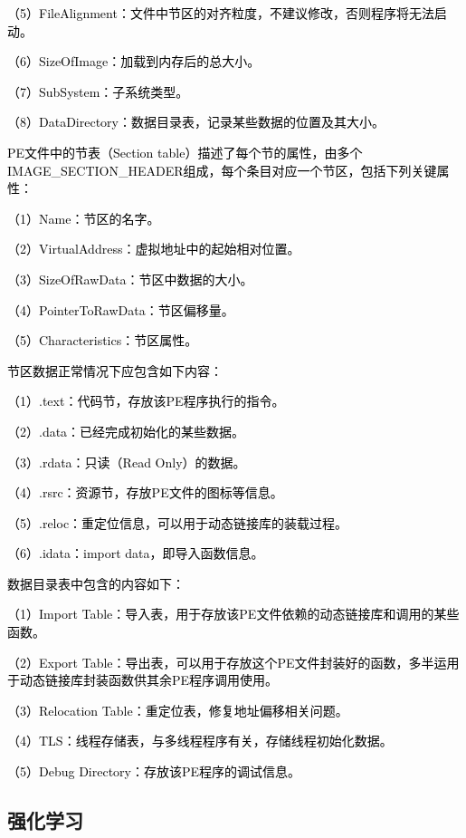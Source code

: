 \textcolor{black}{（5）FileAlignment：文件中节区的对齐粒度，不建议修改，否则程序将无法启动。}

\textcolor{black}{（6）SizeOfImage：加载到内存后的总大小。}

\textcolor{black}{（7）SubSystem：子系统类型。}

\textcolor{black}{（8）DataDirectory：数据目录表，记录某些数据的位置及其大小。}

\textcolor{black}{PE文件中的节表（Section table）描述了每个节的属性，由多个IMAGE\_SECTION\_HEADER组成，每个条目对应一个节区，包括下列关键属性：}

\textcolor{black}{（1）Name：节区的名字。}

\textcolor{black}{（2）VirtualAddress：虚拟地址中的起始相对位置。}

\textcolor{black}{（3）SizeOfRawData：节区中数据的大小。}

\textcolor{black}{（4）PointerToRawData：节区偏移量。}

\textcolor{black}{（5）Characteristics：节区属性。}

\textcolor{black}{节区数据正常情况下应包含如下内容：}

\textcolor{black}{（1）.text：代码节，存放该PE程序执行的指令。}

\textcolor{black}{（2）.data：已经完成初始化的某些数据。}

\textcolor{black}{（3）.rdata：只读（Read Only）的数据。}

\textcolor{black}{（4）.rsrc：资源节，存放PE文件的图标等信息。}

\textcolor{black}{（5）.reloc：重定位信息，可以用于动态链接库的装载过程。}

\textcolor{black}{（6）.idata：import data，即导入函数信息。}

\textcolor{black}{数据目录表中包含的内容如下：}

\textcolor{black}{（1）Import Table：导入表，用于存放该PE文件依赖的动态链接库和调用的某些函数。}

\textcolor{black}{（2）Export Table：导出表，可以用于存放这个PE文件封装好的函数，多半运用于动态链接库封装函数供其余PE程序调用使用。}

\textcolor{black}{（3）Relocation Table：重定位表，修复地址偏移相关问题。}

\textcolor{black}{（4）TLS：线程存储表，与多线程程序有关，存储线程初始化数据。}

\textcolor{black}{（5）Debug Directory：存放该PE程序的调试信息。}

\subsection{强化学习}

